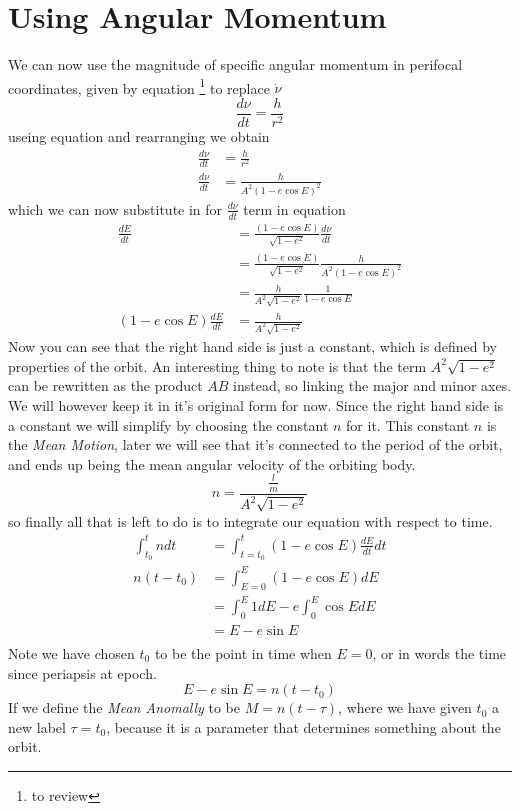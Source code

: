 \section{Using Angular Momentum}

We can now use the magnitude of specific angular momentum in perifocal coordinates, given by equation \footnote{to review}
to replace $\dot{\nu}$
\begin{equation*}
\frac{d\nu}{dt} = \frac{h}{r^2}
\end{equation*}
useing equation  and rearranging we obtain
\begin{align}
\frac{d\nu}{dt}&=\frac{h}{r^2}\nonumber \\
\frac{d\nu}{dt}&= \frac{h}{A^2\left(1-e \cos E \right)^2}
\end{align}
which we can now substitute in for $\frac{d\nu}{dt}$ term in equation 
\begin{align}
\frac{dE}{dt} & = \frac{(1-e\cos E)}{\sqrt{1-e^2}}\frac{d\nu}{dt}\nonumber \\
& = \frac{(1-e\cos E)}{\sqrt{1-e^2}}\frac{h}{A^2\left(1-e \cos E \right)^2}\nonumber \\
&= \frac{h}{A^2\sqrt{1-e^2}}\frac{1}{1-e \cos E}\nonumber \\
\left(1-e \cos E \right)\frac{dE}{dt}&= \frac{h}{A^2\sqrt{1-e^2}}
\end{align}
Now you can see that the right hand side is just a constant, 
which is defined by properties of the orbit.
An interesting thing to note is that the term $A^2\sqrt{1-e^2}$ can be
rewritten as the product $AB$ instead, so linking the major and minor axes.
We will however keep it in it's original form for now. Since the right hand
side is a constant we will simplify by choosing the constant $n$ for it. 
This constant $n$ is the \emph{Mean Motion}, later we will see that it's 
connected to the period of the orbit, and ends up being the mean 
angular velocity of the orbiting body.
\begin{equation}
n = \frac{\frac{l}{m}}{A^2\sqrt{1-e^2}}\label{eq:Kepler4}
\end{equation}
so finally all that is left to do is to integrate our equation with respect to time.
\begin{align}
\int_{t_0}^t n dt &= \int_{t=t_0}^t\left(1-e \cos E \right)\frac{dE}{dt} dt\nonumber \\
n (t-t_0) &=\int_{E=0}^E\left(1-e \cos E \right)dE \nonumber \\
&=\int_0^E 1 dE - e \int_0^E \cos E dE\nonumber \\
&=E - e \sin E\\
\end{align}
Note we have chosen $t_0$ to be the point in time when $E=0$, or in words
the time since periapsis at epoch.
\begin{equation}
E - e \sin E=n(t-t_0)
\end{equation}
If we define the \emph{Mean Anomally} to be $M = n(t-\tau)$,
where we have given $t_0$ a new label $\tau = t_0$, because it is a parameter
that determines something about the orbit.

